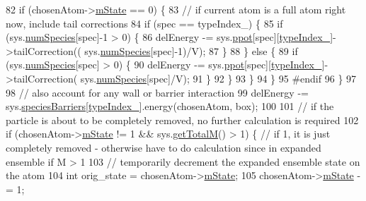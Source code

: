 \begin{DoxyCode}
82                 \textcolor{keywordflow}{if} (chosenAtom->\hyperlink{classatom_a3cb00c0c5b7533657e05af6ff4a42740}{mState} == 0) \{
83                     \textcolor{comment}{// if current atom is a full atom right now, include tail corrections}
84                     \textcolor{keywordflow}{if} (spec == typeIndex\_) \{
85                                 \textcolor{keywordflow}{if} (sys.\hyperlink{classsim_system_a9eea865e6dc1cff377b1e79c4d9c23f0}{numSpecies}[spec]-1 > 0) \{
86                                     delEnergy -= sys.\hyperlink{classsim_system_ad2e290b5963f132e6a3a56cee35c8e9f}{ppot}[spec][\hyperlink{classmc_move_acb731965547b0326ef318ec96da8b46a}{typeIndex\_}]->tailCorrection((
      sys.\hyperlink{classsim_system_a9eea865e6dc1cff377b1e79c4d9c23f0}{numSpecies}[spec]-1)/V);
87                                 \}
88                     \} \textcolor{keywordflow}{else} \{
89                                 \textcolor{keywordflow}{if} (sys.\hyperlink{classsim_system_a9eea865e6dc1cff377b1e79c4d9c23f0}{numSpecies}[spec] > 0) \{
90                                     delEnergy -= sys.\hyperlink{classsim_system_ad2e290b5963f132e6a3a56cee35c8e9f}{ppot}[spec][\hyperlink{classmc_move_acb731965547b0326ef318ec96da8b46a}{typeIndex\_}]->tailCorrection(
      sys.\hyperlink{classsim_system_a9eea865e6dc1cff377b1e79c4d9c23f0}{numSpecies}[spec]/V);
91                                 \}
92                         \}
93                 \}
94             \}
95 \textcolor{preprocessor}{#endif}
96 \textcolor{preprocessor}{}        \}
97 
98         \textcolor{comment}{// also account for any wall or barrier interaction}
99     delEnergy -= sys.\hyperlink{classsim_system_a5ae652ff4519f39c3862abae32a9581b}{speciesBarriers}[\hyperlink{classmc_move_acb731965547b0326ef318ec96da8b46a}{typeIndex\_}].energy(chosenAtom, box);
100 
101         \textcolor{comment}{// if the particle is about to be completely removed, no further calculation is required}
102         \textcolor{keywordflow}{if} (chosenAtom->\hyperlink{classatom_a3cb00c0c5b7533657e05af6ff4a42740}{mState} != 1 && sys.\hyperlink{classsim_system_aa4ad1afff101bb530e1590df05035276}{getTotalM}() > 1) \{ \textcolor{comment}{// if 1, it is just completely
       removed - otherwise have to do calculation since in expanded ensemble if M > 1}
103             \textcolor{comment}{// temporarily decrement the expanded ensemble state on the atom}
104             \textcolor{keywordtype}{int} orig\_state = chosenAtom->\hyperlink{classatom_a3cb00c0c5b7533657e05af6ff4a42740}{mState};
105             chosenAtom->\hyperlink{classatom_a3cb00c0c5b7533657e05af6ff4a42740}{mState} -= 1;

\end{DoxyCode}

